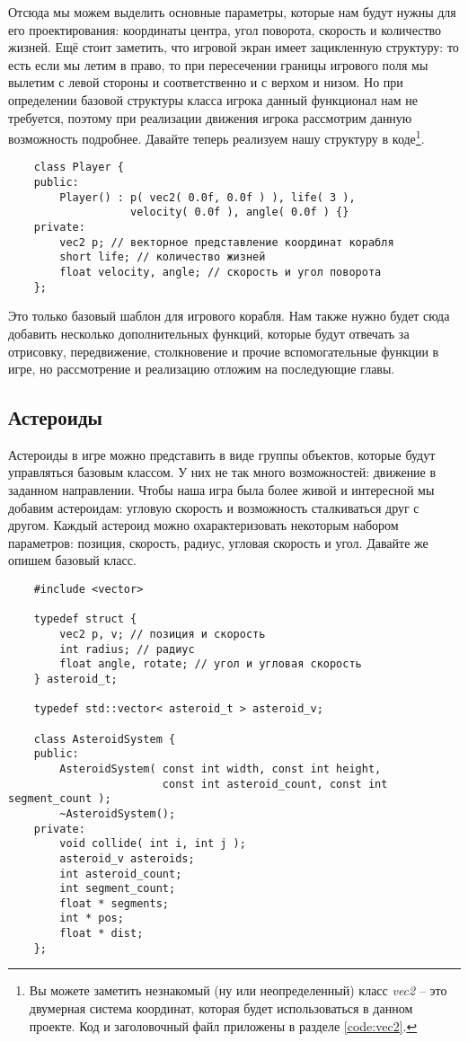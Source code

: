 Отсюда мы можем выделить основные параметры, которые нам будут нужны для его проектирования: координаты 
центра, угол поворота, скорость и количество жизней. Ещё стоит заметить, что игровой экран имеет зацикленную 
структуру: то есть если мы летим в право, то при пересечении границы игрового поля мы вылетим с левой 
стороны и соответственно и с верхом и низом. Но при определении базовой структуры класса игрока данный 
функционал нам не требуется, поэтому при реализации движения игрока рассмотрим данную возможность 
подробнее. Давайте теперь реализуем нашу структуру в коде\footnote{Вы можете заметить незнакомый 
    (ну или неопределенный) класс \emph{vec2} -- это двумерная система координат, которая будет 
    использоваться в данном проекте. Код и заголовочный файл приложены в разделе \ref{code:vec2}.}.
\begin{lstlisting}
    class Player {
    public:
        Player() : p( vec2( 0.0f, 0.0f ) ), life( 3 ), 
                   velocity( 0.0f ), angle( 0.0f ) {}
    private:
        vec2 p; // векторное представление координат корабля
        short life; // количество жизней
        float velocity, angle; // скорость и угол поворота
    };
\end{lstlisting}

Это только базовый шаблон для игрового корабля. Нам также нужно будет сюда добавить несколько дополнительных 
функций, которые будут отвечать за отрисовку, передвижение, столкновение и прочие вспомогательные функции 
в игре, но рассмотрение и реализацию отложим на последующие главы.

\subsection{Астероиды}
Астероиды в игре можно представить в виде группы объектов, которые будут управляться базовым классом.
У них не так много возможностей: движение в заданном направлении. Чтобы наша игра была более живой и 
интересной мы добавим астероидам: угловую скорость и возможность сталкиваться друг с другом. 
Каждый астероид можно охарактеризовать некоторым набором параметров: позиция, скорость, радиус, угловая 
скорость и угол. Давайте же опишем базовый класс.
\begin{lstlisting}
    #include <vector>

    typedef struct {
        vec2 p, v; // позиция и скорость
        int radius; // радиус
        float angle, rotate; // угол и угловая скорость
    } asteroid_t;

    typedef std::vector< asteroid_t > asteroid_v; 

    class AsteroidSystem {
    public:
        AsteroidSystem( const int width, const int height, 
                        const int asteroid_count, const int segment_count );
        ~AsteroidSystem();
    private:
        void collide( int i, int j );
        asteroid_v asteroids;
        int asteroid_count;
        int segment_count;
        float * segments;
        int * pos;
        float * dist;
    };
\end{lstlisting}

